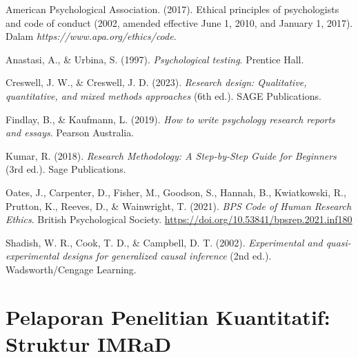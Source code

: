 \documentclass[
  indonesian,
  letterpaper,
  DIV=11,
  numbers=noendperiod]{scrreprt}
\newlength{\cslhangindent}
\newenvironment{CSLReferences}[2] %
 {\begin{list}{}{%
  \setlength{\itemindent}{0pt}
  \setlength{\leftmargin}{0pt}
  \setlength{\parsep}{0pt}
  \ifodd #1
   \setlength{\leftmargin}{\cslhangindent}
   \setlength{\itemindent}{-1\cslhangindent}
  \fi
  \setlength{\itemsep}{#2\baselineskip}}}
 {\end{list}}
\begin{document}
\label{refs--14}
\begin{CSLReferences}{1}{0}
American Psychological Association. (2017). Ethical principles of
psychologists and code of conduct (2002, amended effective June 1, 2010,
and January 1, 2017). Dalam \emph{https://www.apa.org/ethics/code}.

Anastasi, A., \& Urbina, S. (1997). \emph{Psychological testing}.
Prentice Hall.

Creswell, J. W., \& Creswell, J. D. (2023). \emph{Research design:
Qualitative, quantitative, and mixed methods approaches} (6th ed.). SAGE
Publications.

Findlay, B., \& Kaufmann, L. (2019). \emph{How to write psychology
research reports and essays}. Pearson Australia.

Kumar, R. (2018). \emph{Research Methodology: A Step-by-Step Guide for
Beginners} (3rd ed.). Sage Publications.

Oates, J., Carpenter, D., Fisher, M., Goodson, S., Hannah, B.,
Kwiatkowski, R., Prutton, K., Reeves, D., \& Wainwright, T. (2021).
\emph{BPS Code of Human Research Ethics}. British Psychological Society.
\url{https://doi.org/10.53841/bpsrep.2021.inf180}

Shadish, W. R., Cook, T. D., \& Campbell, D. T. (2002).
\emph{Experimental and quasi-experimental designs for generalized causal
inference} (2nd ed.). Wadsworth/Cengage Learning.

\end{CSLReferences}

\chapter{Pelaporan Penelitian Kuantitatif: Struktur
IMRaD}\label{pelaporan-penelitian-kuantitatif-struktur-imrad}
\end{document}
